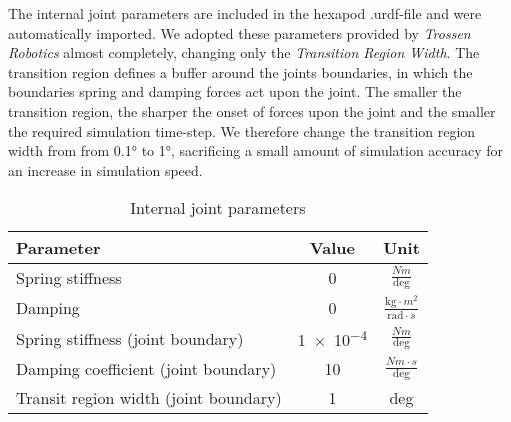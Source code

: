 The internal joint parameters are included in the hexapod .urdf-file and were automatically imported.
We adopted these parameters provided by \textit{Trossen Robotics} \parencite{interboticsGithub} almost completely, changing only the \textit{Transition Region Width}.
The transition region defines a buffer around the joints boundaries, in which the boundaries spring and damping forces act upon the joint.
The smaller the transition region, the sharper the onset of forces upon the joint and the smaller the required simulation time-step.
We  therefore change the transition region width from  from 0.1° to 1°, sacrificing a small amount of simulation accuracy for an increase in simulation speed.

{\def\arraystretch{1.4}\tabcolsep=5pt
	\begin{table}[!h]
		\centering
		\begin{tabular}{| l | c | c |}
			\hline
			\textbf{Parameter} & \textbf{Value} & \textbf{Unit}\\
			\hline
			\hline
			Spring stiffness & 0 & $\frac{Nm}{\text{deg}}$\\
			
			Damping & 0 &  $\frac{\text{kg} \cdot m^2}{\text{rad} \cdot s}$\\
			
			Spring stiffness (joint boundary) & \num{1e-4} & $\frac{Nm}{\text{deg}}$ \\
			
			Damping coefficient (joint boundary) &  10 & $\frac{Nm \cdot s}{\text{deg}}$\\
			
			Transit region width (joint boundary) & 1 &  deg\\
			\hline
		\end{tabular}
		
		\caption{Internal joint parameters}
		\label{table: Joint parameters}
	\end{table}
}

